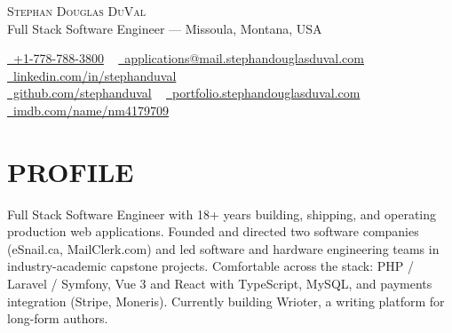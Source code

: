 \documentclass[letterpaper,11pt]{article}
\begin{document}
\begin{center}
    {\Huge \scshape Stephan Douglas DuVal} \\ \vspace{2pt}
    \small Full Stack Software Engineer — Missoula, Montana, USA \\ \vspace{4pt}

    \href{tel:+17787883800}{\raisebox{-0.1\height}\faPhone\ +1-778-788-3800} ~
    \href{mailto:applications@mail.stephandouglasduval.com}{\raisebox{-0.2\height}\faEnvelope\ applications@mail.stephandouglasduval.com} ~
    \href{https://www.linkedin.com/in/stephanduval/}{\raisebox{-0.2\height}\faLinkedin\ linkedin.com/in/stephanduval} \\ \vspace{2pt}
    \href{https://github.com/stephanduval}{\raisebox{-0.2\height}\faGithub\ github.com/stephanduval} ~
    \href{https://portfolio.stephandouglasduval.com}{\raisebox{-0.2\height}\faUser\ portfolio.stephandouglasduval.com} \\ \vspace{2pt}
    \href{https://www.imdb.com/name/nm4179709/?ref_=fn_t_2}{\raisebox{-0.2\height}\faImdb\ imdb.com/name/nm4179709}
\end{center}

\section{PROFILE}
\small
Full Stack Software Engineer with 18+ years building, shipping, and operating production web applications. Founded and directed two software companies (eSnail.ca, MailClerk.com) and led software and hardware engineering teams in industry-academic capstone projects. Comfortable across the stack: PHP / Laravel / Symfony, Vue 3 and React with TypeScript, MySQL, and payments integration (Stripe, Moneris). Currently building Wrioter, a writing platform for long-form authors.
\vspace{4pt}

\end{document}
